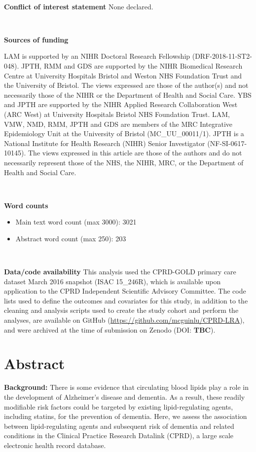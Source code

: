 \documentclass[
]{article}
\providecommand{\tightlist}{%
  \setlength{\itemsep}{0pt}\setlength{\parskip}{0pt}}
\begin{document}
~

\textbf{Conflict of interest statement}
None declared.

~

\textbf{Sources of funding}

LAM is supported by an NIHR Doctoral Research Fellowship (DRF-2018-11-ST2-048). JPTH, RMM and GDS are supported by the NIHR Biomedical Research Centre at University Hospitals Bristol and Weston NHS Foundation Trust and the University of Bristol. The views expressed are those of the author(s) and not necessarily those of the NIHR or the Department of Health and Social Care. YBS and JPTH are supported by the NIHR Applied Research Collaboration West (ARC West) at University Hospitals Bristol NHS Foundation Trust. LAM, VMW, NMD, RMM, JPTH and GDS are members of the MRC Integrative Epidemiology Unit at the University of Bristol (MC\_UU\_00011/1). JPTH is a National Institute for Health Research (NIHR) Senior Investigator (NF-SI-0617-10145).
The views expressed in this article are those of the authors and do not necessarily represent those of the NHS, the NIHR, MRC, or the Department of Health and Social Care.

~

\textbf{Word counts}

\begin{itemize}
\tightlist
\item
  Main text word count (max 3000): 3021
\item
  Abstract word count (max 250): 203
\end{itemize}

~

\textbf{Data/code availability}
This analysis used the CPRD-GOLD primary care dataset March 2016 snapshot (ISAC 15\_246R), which is available upon application to the CPRD Independent Scientific Advisory Committee. The code lists used to define the outcomes and covariates for this study, in addition to the cleaning and analysis scripts used to create the study cohort and perform the analyses, are available on GitHub (\url{https://github.com/mcguinlu/CPRD-LRA}), and were archived at the time of submission on Zenodo (DOI: \textbf{TBC}).

\newpage

\hypertarget{abstract}{%
\section{Abstract}\label{abstract}}

\textbf{Background:} There is some evidence that circulating blood lipids play a role in the development of Alzheimer's disease and dementia. As a result, these readily modifiable risk factors could be targeted by existing lipid-regulating agents, including statins, for the prevention of dementia. Here, we assess the association between lipid-regulating agents and subsequent risk of dementia and related conditions in the Clinical Practice Research Datalink (CPRD), a large scale electronic health record database.
\end{document}

